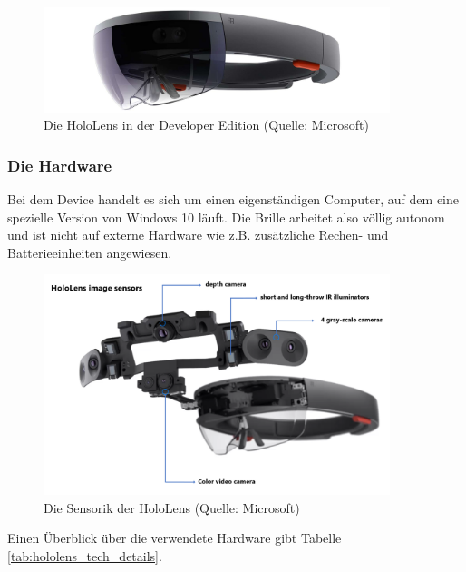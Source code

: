 \begin{figure}[h!]
	\centering
	\includegraphics[width=0.9\textwidth]{images/hololens.jpg}
	\caption{Die HoloLens in der Developer Edition (Quelle: Microsoft)}
	\label{img:hololens}
\end{figure}

\subsubsection{Die Hardware}
Bei dem Device handelt es sich um einen eigenständigen Computer, auf dem eine spezielle Version von Windows 10 läuft. Die Brille arbeitet also völlig autonom und ist nicht auf externe Hardware wie z.B. zusätzliche Rechen- und Batterieeinheiten angewiesen.\\

\label{sec-2-1-2}
\begin{figure}[h!]
	\centering
	\includegraphics[width=0.9\textwidth]{images/hololens_tech.png}
	\caption{Die Sensorik der HoloLens (Quelle: Microsoft)}
	\label{img:hololens_tech}
\end{figure}

Einen Überblick über die verwendete Hardware gibt Tabelle \ref{tab:hololens_tech_details}.

